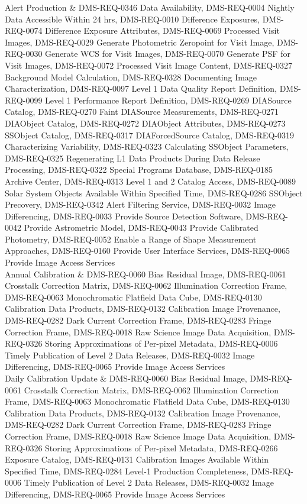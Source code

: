 Alert Production & DMS-REQ-0346 Data Availability, DMS-REQ-0004 Nightly Data Accessible Within 24 hrs, DMS-REQ-0010 Difference Exposures, DMS-REQ-0074 Difference Exposure Attributes, DMS-REQ-0069 Processed Visit Images, DMS-REQ-0029 Generate Photometric Zeropoint for Visit Image, DMS-REQ-0030 Generate WCS for Visit Images, DMS-REQ-0070 Generate PSF for Visit Images, DMS-REQ-0072 Processed Visit Image Content, DMS-REQ-0327 Background Model Calculation, DMS-REQ-0328 Documenting Image Characterization, DMS-REQ-0097 Level 1 Data Quality Report Definition, DMS-REQ-0099 Level 1 Performance Report Definition, DMS-REQ-0269 DIASource Catalog, DMS-REQ-0270 Faint DIASource Measurements, DMS-REQ-0271 DIAObject Catalog, DMS-REQ-0272 DIAObject Attributes, DMS-REQ-0273 SSObject Catalog, DMS-REQ-0317 DIAForcedSource Catalog, DMS-REQ-0319 Characterizing Variability, DMS-REQ-0323 Calculating SSObject Parameters, DMS-REQ-0325 Regenerating L1 Data Products During Data Release Processing, DMS-REQ-0322 Special Programs Database, DMS-REQ-0185 Archive Center, DMS-REQ-0313 Level 1 and 2 Catalog Access, DMS-REQ-0089 Solar System Objects Available Within Specified Time, DMS-REQ-0286 SSObject Precovery, DMS-REQ-0342 Alert Filtering Service, DMS-REQ-0032 Image Differencing, DMS-REQ-0033 Provide Source Detection Software, DMS-REQ-0042 Provide Astrometric Model, DMS-REQ-0043 Provide Calibrated Photometry, DMS-REQ-0052 Enable a Range of Shape Measurement Approaches, DMS-REQ-0160 Provide User Interface Services, DMS-REQ-0065 Provide Image Access Services\\\hline
Annual Calibration & DMS-REQ-0060 Bias Residual Image, DMS-REQ-0061 Crosstalk Correction Matrix, DMS-REQ-0062 Illumination Correction Frame, DMS-REQ-0063 Monochromatic Flatfield Data Cube, DMS-REQ-0130 Calibration Data Products, DMS-REQ-0132 Calibration Image Provenance, DMS-REQ-0282 Dark Current Correction Frame, DMS-REQ-0283 Fringe Correction Frame, DMS-REQ-0018 Raw Science Image Data Acquisition, DMS-REQ-0326 Storing Approximations of Per-pixel Metadata, DMS-REQ-0006 Timely Publication of Level 2 Data Releases, DMS-REQ-0032 Image Differencing, DMS-REQ-0065 Provide Image Access Services\\\hline
Daily Calibration Update & DMS-REQ-0060 Bias Residual Image, DMS-REQ-0061 Crosstalk Correction Matrix, DMS-REQ-0062 Illumination Correction Frame, DMS-REQ-0063 Monochromatic Flatfield Data Cube, DMS-REQ-0130 Calibration Data Products, DMS-REQ-0132 Calibration Image Provenance, DMS-REQ-0282 Dark Current Correction Frame, DMS-REQ-0283 Fringe Correction Frame, DMS-REQ-0018 Raw Science Image Data Acquisition, DMS-REQ-0326 Storing Approximations of Per-pixel Metadata, DMS-REQ-0266 Exposure Catalog, DMS-REQ-0131 Calibration Images Available Within Specified Time, DMS-REQ-0284 Level-1 Production Completeness, DMS-REQ-0006 Timely Publication of Level 2 Data Releases, DMS-REQ-0032 Image Differencing, DMS-REQ-0065 Provide Image Access Services\\\hline
